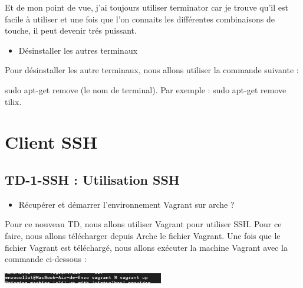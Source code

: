 \documentclass[12pt]{article}
\begin{document}
\vspace{0.3cm}

Et de mon point de vue, j'ai toujours utiliser terminator car je trouve qu'il est facile à utiliser et une fois que l'on connaits
les différentes combinaisons de touche, il peut devenir trés puissant.

\vspace{0.3cm}

\begin{itemize}
  \item Désinstaller les autres terminaux
\end{itemize}

\vspace{0.3cm}

Pour désinstaller les autre terminaux, nous allons utiliser la commande suivante : 

\vspace{0.3cm}

sudo apt-get remove (le nom de terminal). Par exemple : sudo apt-get remove tilix.




\newpage

\section{Client SSH}

  \subsection{TD-1-SSH : Utilisation SSH}

\begin{itemize}
  \item Récupérer et démarrer l'environnement Vagrant sur arche ?
\end{itemize}

\vspace{0.3cm}

Pour ce nouveau TD, nous allons utiliser Vagrant pour utiliser SSH. Pour ce faire, nous allons télécharger depuis Arche le fichier Vagrant. Une fois que le fichier Vagrant est téléchargé, nous allons exécuter la machine Vagrant avec la commande ci-dessous :

\vspace{0.3cm}

\begin{center}
  \includegraphics[width=7cm]{Image-TD-SSH-1/vagrant_up.png}
\end{center}
\end{document}
